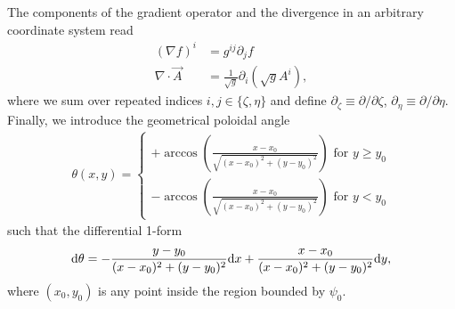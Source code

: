 The components of the gradient operator and the divergence in an arbitrary coordinate
system read
\begin{subequations}
\begin{align}
  \left( \nabla f \right)^i &= g^{ij}\partial_j f \\
  \nabla \cdot \vec A &= \frac{1}{\sqrt g}\partial_i \left( \sqrt{g} A^i  \right),
\end{align}
  \label{eq:arbitrary}
\end{subequations}
where we sum over repeated indices $i,j\in\{\zeta,\eta\}$ and define $\partial_\zeta \equiv \partial/\partial \zeta$, $\partial_\eta \equiv \partial/\partial \eta$.
%
Finally, we introduce the 
geometrical poloidal angle 
\begin{align}
  \theta (x,y) = \begin{cases}
    +\arccos\left( \frac{x-x_0}{\sqrt{(x-x_0)^2 + (y-y_0)^2}} \right) \text{ for } y\geq y_0 \\
    -\arccos\left( \frac{x-x_0}{\sqrt{(x-x_0)^2 + (y-y_0)^2}} \right) \text{ for } y< y_0 
  \end{cases}
  \label{eq:deftheta}
\end{align}
such that the differential 1-form
\begin{align}
  \mathrm{d} \theta = 
    -\frac{y-y_0}{(x-x_0)^2+(y-y_0)^2} \mathrm{d} x
    +\frac{x-x_0}{(x-x_0)^2+(y-y_0)^2} \mathrm{d} y,
  \label{eq:theta}
\end{align}
where $(x_0,y_0)$ is any point inside the region bounded by $\psi_0$.

